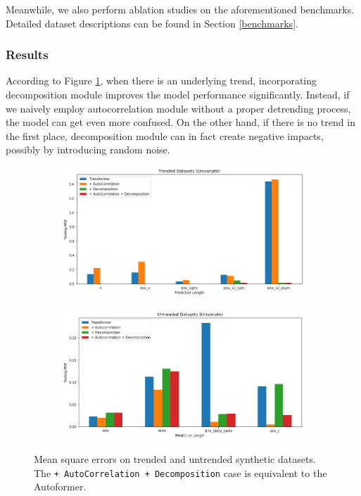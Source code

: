 Meanwhile, we also perform ablation studies on the aforementioned benchmarks. Detailed dataset descriptions can be found in Section \ref{benchmarks}. 

\subsubsection{Results}

According to Figure \ref{fig:trended_mse}, when there is an underlying trend, incorporating decomposition module improves the model performance significantly. 
Instead, if we naively employ autocorrelation module without a proper detrending process, the model can get even more confused. 
On the other hand, if there is no trend in the first place, decomposition module can in fact create negative impacts, possibly by introducing random noise. 

\begin{figure}
    \centering
    \begin{subfigure}{0.6\textwidth}
        \includegraphics[width=\textwidth]{img/mse_trended.png}
    \end{subfigure}
    \begin{subfigure}{0.6\textwidth}
        \includegraphics[width=\textwidth]{img/mse_untrended.png}
    \end{subfigure}
    \caption{Mean square errors on trended and untrended synthetic datasets. The \texttt{+ AutoCorrelation + Decomposition} case is equivalent to the Autoformer.}
    \label{fig:trended_mse}
\end{figure}

